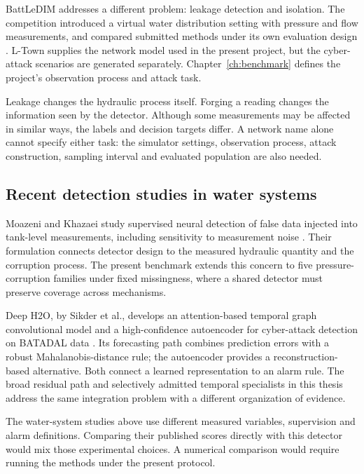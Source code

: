 BattLeDIM addresses a different problem: leakage detection and isolation. The competition introduced a virtual water distribution setting with pressure and flow measurements, and compared submitted methods under its own evaluation design \cite{battledim}. L-Town supplies the network model used in the present project, but the cyber-attack scenarios are generated separately. Chapter~\ref{ch:benchmark} defines the project's observation process and attack task.

Leakage changes the hydraulic process itself. Forging a reading changes the information seen by the detector. Although some measurements may be affected in similar ways, the labels and decision targets differ. A network name alone cannot specify either task: the simulator settings, observation process, attack construction, sampling interval and evaluated population are also needed.

\subsection{Recent detection studies in water systems}
Moazeni and Khazaei study supervised neural detection of false data injected into tank-level measurements, including sensitivity to measurement noise \cite{moazeni2022}. Their formulation connects detector design to the measured hydraulic quantity and the corruption process. The present benchmark extends this concern to five pressure-corruption families under fixed missingness, where a shared detector must preserve coverage across mechanisms.

Deep H2O, by Sikder et al., develops an attention-based temporal graph convolutional model and a high-confidence autoencoder for cyber-attack detection on BATADAL data \cite{deeph2o2023}. Its forecasting path combines prediction errors with a robust Mahalanobis-distance rule; the autoencoder provides a reconstruction-based alternative. Both connect a learned representation to an alarm rule. The broad residual path and selectively admitted temporal specialists in this thesis address the same integration problem with a different organization of evidence.

The water-system studies above use different measured variables, supervision and alarm definitions. Comparing their published scores directly with this detector would mix those experimental choices. A numerical comparison would require running the methods under the present protocol.

